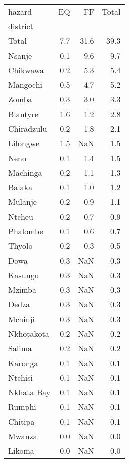 \begin{tabular}{lrrr}
\toprule
hazard &   EQ &    FF &  Total \\
district   &      &       &        \\
\midrule
Total      &  7.7 &  31.6 &   39.3 \\
Nsanje     &  0.1 &   9.6 &    9.7 \\
Chikwawa   &  0.2 &   5.3 &    5.4 \\
Mangochi   &  0.5 &   4.7 &    5.2 \\
Zomba      &  0.3 &   3.0 &    3.3 \\
Blantyre   &  1.6 &   1.2 &    2.8 \\
Chiradzulu &  0.2 &   1.8 &    2.1 \\
Lilongwe   &  1.5 &   NaN &    1.5 \\
Neno       &  0.1 &   1.4 &    1.5 \\
Machinga   &  0.2 &   1.1 &    1.3 \\
Balaka     &  0.1 &   1.0 &    1.2 \\
Mulanje    &  0.2 &   0.9 &    1.1 \\
Ntcheu     &  0.2 &   0.7 &    0.9 \\
Phalombe   &  0.1 &   0.6 &    0.7 \\
Thyolo     &  0.2 &   0.3 &    0.5 \\
Dowa       &  0.3 &   NaN &    0.3 \\
Kasungu    &  0.3 &   NaN &    0.3 \\
Mzimba     &  0.3 &   NaN &    0.3 \\
Dedza      &  0.3 &   NaN &    0.3 \\
Mchinji    &  0.3 &   NaN &    0.3 \\
Nkhotakota &  0.2 &   NaN &    0.2 \\
Salima     &  0.2 &   NaN &    0.2 \\
Karonga    &  0.1 &   NaN &    0.1 \\
Ntchisi    &  0.1 &   NaN &    0.1 \\
Nkhata Bay &  0.1 &   NaN &    0.1 \\
Rumphi     &  0.1 &   NaN &    0.1 \\
Chitipa    &  0.1 &   NaN &    0.1 \\
Mwanza     &  0.0 &   NaN &    0.0 \\
Likoma     &  0.0 &   NaN &    0.0 \\
\bottomrule
\end{tabular}
